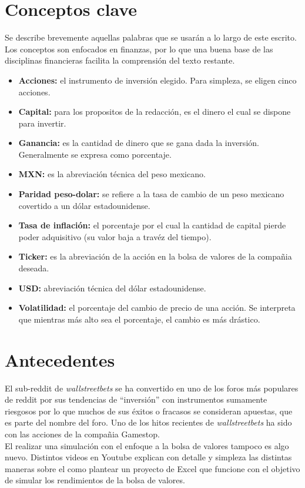 \documentclass[letterpaper, 12pt]{article}
\begin{document}
\begin{justify}
        \section{Conceptos clave}
        \justify
        Se describe brevemente aquellas palabras que se usarán a lo largo de este escrito. Los conceptos son enfocados en finanzas, por lo que una buena base de las disciplinas financieras
        facilita la comprensión del texto restante.
        \begin{itemize}
            \item \textbf{Acciones:} el instrumento de inversión elegido. Para simpleza, se eligen cinco acciones.
            \item \textbf{Capital:} para los propositos de la redacción, es el dinero el cual se dispone para invertir.
            \item \textbf{Ganancia:} es la cantidad de dinero que se gana dada la inversión. Generalmente se expresa como porcentaje.
            \item \textbf{MXN:} es la abreviación técnica del peso mexicano.
            \item \textbf{Paridad peso-dolar:} se refiere a la tasa de cambio de un peso mexicano covertido a un dólar estadounidense.
            \item \textbf{Tasa de inflación:} el porcentaje por el cual la cantidad de capital pierde poder adquisitivo (su valor baja a travéz del tiempo).
            \item \textbf{Ticker:} es la abreviación de la acción en la bolsa de valores de la compañia deseada.
            \item \textbf{USD:} abreviación técnica del dólar estadounidense.
            \item \textbf{Volatilidad:} el porcentaje del cambio de precio de una acción. Se interpreta que mientras más alto sea el porcentaje, el cambio es más drástico.
        \end{itemize}
        \section{Antecedentes}
        \justify
        El sub-reddit de \emph{wallstreetbets} se ha convertido en uno de los foros más populares de reddit por sus tendencias de ``inversión'' con instrumentos sumamente riesgosos por lo que muchos de
        sus éxitos o fracasos se consideran apuestas, que es parte del nombre del foro. Uno de los hitos recientes de \emph{wallstreetbets} ha sido con las acciones de la compañia Gamestop.
        \\\newline
        El realizar una simulación con el enfoque a la bolsa de valores tampoco es algo nuevo. Distintos videos en Youtube explican con detalle y simpleza las distintas maneras sobre el como plantear un proyecto de Excel
        que funcione con el objetivo de simular los rendimientos de la bolsa de valores.

\end{justify}
\end{document}
